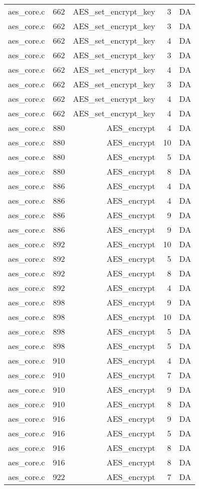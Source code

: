 \begin{table*}
\begin{tabular}{clrrr}
aes\_core.c&662&AES\_set\_encrypt\_key&3 &DA\\
aes\_core.c&662&AES\_set\_encrypt\_key&3 &DA\\
aes\_core.c&662&AES\_set\_encrypt\_key&4 &DA\\
aes\_core.c&662&AES\_set\_encrypt\_key&3 &DA\\
aes\_core.c&662&AES\_set\_encrypt\_key&4 &DA\\
aes\_core.c&662&AES\_set\_encrypt\_key&3 &DA\\
aes\_core.c&662&AES\_set\_encrypt\_key&4 &DA\\
aes\_core.c&662&AES\_set\_encrypt\_key&4 &DA\\
aes\_core.c&880&AES\_encrypt&4 &DA\\
aes\_core.c&880&AES\_encrypt&10&DA\\
aes\_core.c&880&AES\_encrypt&5 &DA\\
aes\_core.c&880&AES\_encrypt&8 &DA\\
aes\_core.c&886&AES\_encrypt&4 &DA\\
aes\_core.c&886&AES\_encrypt&4 &DA\\
aes\_core.c&886&AES\_encrypt&9 &DA\\
aes\_core.c&886&AES\_encrypt&9 &DA\\
aes\_core.c&892&AES\_encrypt&10&DA\\
aes\_core.c&892&AES\_encrypt&5 &DA\\
aes\_core.c&892&AES\_encrypt&8 &DA\\
aes\_core.c&892&AES\_encrypt&4 &DA\\
aes\_core.c&898&AES\_encrypt&9 &DA\\
aes\_core.c&898&AES\_encrypt&10&DA\\
aes\_core.c&898&AES\_encrypt&5 &DA\\
aes\_core.c&898&AES\_encrypt&5 &DA\\
aes\_core.c&910&AES\_encrypt&4 &DA\\
aes\_core.c&910&AES\_encrypt&7 &DA\\
aes\_core.c&910&AES\_encrypt&9 &DA\\
aes\_core.c&910&AES\_encrypt&8 &DA\\
aes\_core.c&916&AES\_encrypt&9 &DA\\
aes\_core.c&916&AES\_encrypt&5 &DA\\
aes\_core.c&916&AES\_encrypt&8 &DA\\
aes\_core.c&916&AES\_encrypt&8 &DA\\
aes\_core.c&922&AES\_encrypt&7 &DA\\

\end{tabular}
\end{table*}

